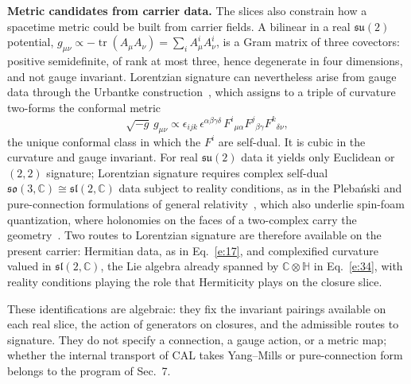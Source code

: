 \documentclass[10pt]{article}
\newcommand{\tr}{\operatorname{tr}}
\begin{document}
\smallskip
\noindent\textbf{Metric candidates from carrier data.} The slices also constrain how a spacetime metric could be built from carrier fields. A bilinear in a real $\mathfrak{su}(2)$ potential, $g_{\mu\nu}\propto-\tr(A_\mu A_\nu)=\sum_iA^i_\mu A^i_\nu$, is a Gram matrix of three covectors: positive semidefinite, of rank at most three, hence degenerate in four dimensions, and not gauge invariant. Lorentzian signature can nevertheless arise from gauge data through the Urbantke construction~\cite{urbantke}, which assigns to a triple of curvature two-forms the conformal metric
\begin{equation}
\sqrt{-g}\,g_{\mu\nu}\propto\epsilon_{ijk}\,\epsilon^{\alpha\beta\gamma\delta}\,F^i{}_{\mu\alpha}F^j{}_{\beta\gamma}F^k{}_{\delta\nu},\label{e:55}
\end{equation}
the unique conformal class in which the $F^i$ are self-dual. It is cubic in the curvature and gauge invariant. For real $\mathfrak{su}(2)$ data it yields only Euclidean or $(2,2)$ signature; Lorentzian signature requires complex self-dual $\mathfrak{so}(3,\mathbb C)\cong\mathfrak{sl}(2,\mathbb C)$ data subject to reality conditions, as in the Pleba\'nski and pure-connection formulations of general relativity~\cite{plebanski,cdj,krasnov,freidel}, which also underlie spin-foam quantization, where holonomies on the faces of a two-complex carry the geometry~\cite{baezspinfoam}. Two routes to Lorentzian signature are therefore available on the present carrier: Hermitian data, as in Eq.~\eqref{e:17}, and complexified curvature valued in $\mathfrak{sl}(2,\mathbb C)$, the Lie algebra already spanned by $\mathbb C\otimes\mathbb H$ in Eq.~\eqref{e:34}, with reality conditions playing the role that Hermiticity plays on the closure slice.

These identifications are algebraic: they fix the invariant pairings available on each real slice, the action of generators on closures, and the admissible routes to signature. They do not specify a connection, a gauge action, or a metric map; whether the internal transport of CAL takes Yang--Mills or pure-connection form belongs to the program of Sec.~7.
\end{document}
